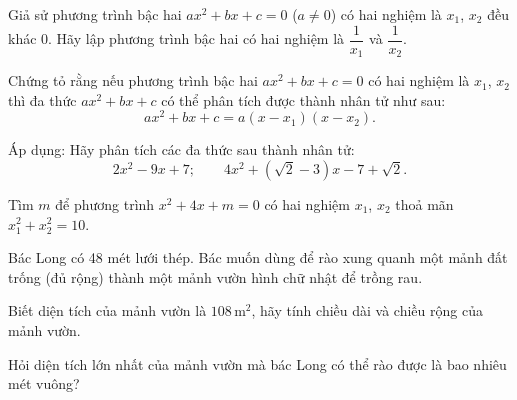 \begin{practice}
\begin{questions}[resume=SBT]
        \answerline
        \answerline
        \answerline

        \item Giả sử phương trình bậc hai $ax^2+bx+c=0$ ($a\ne0$) có hai nghiệm là $x_1$, $x_2$ đều khác 0. Hãy lập phương trình bậc hai có hai nghiệm là $\dfrac{1}{x_1}$ và $\dfrac{1}{x_2}$.

        \answerline
        \answerline

        \item Chứng tỏ rằng nếu phương trình bậc hai $ax^2+bx+c=0$ có hai nghiệm là $x_1$, $x_2$ thì đa thức $ax^2+bx+c$ có thể phân tích được thành nhân tử như sau:
        \[
            ax^2+bx+c=a(x-x_1)(x-x_2).
        \]

        Áp dụng: Hãy phân tích các đa thức sau thành nhân tử:
        \[
            2x^2-9x+7;\qquad 4x^2+(\sqrt{2}-3)x-7+\sqrt{2}.
        \]

        \answerline
        \answerline
        \answerline

        \item Tìm $m$ để phương trình $x^2+4x+m=0$ có hai nghiệm $x_1$, $x_2$ thoả mãn $x_1^2+x_2^2=10$.

        \answerline
        \answerline

        \item Bác Long có 48 mét lưới thép. Bác muốn dùng để rào xung quanh một mảnh đất trống (đủ rộng) thành một mảnh vườn hình chữ nhật để trồng rau.
        \begin{questions}
            \item Biết diện tích của mảnh vườn là $108\,\text{m}^2$, hãy tính chiều dài và chiều rộng của mảnh vườn.
            \item Hỏi diện tích lớn nhất của mảnh vườn mà bác Long có thể rào được là bao nhiêu mét vuông?
        \end{questions}

        \answerline
        \answerline
        \answerline
    \end{questions}
\end{practice}
